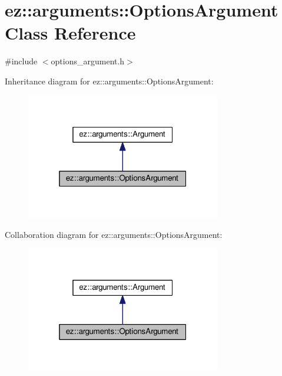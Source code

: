 \hypertarget{classez_1_1arguments_1_1OptionsArgument}{}\section{ez\+:\+:arguments\+:\+:Options\+Argument Class Reference}
\label{classez_1_1arguments_1_1OptionsArgument}


{\ttfamily \#include $<$options\+\_\+argument.\+h$>$}



Inheritance diagram for ez\+:\+:arguments\+:\+:Options\+Argument\+:
\nopagebreak
\begin{figure}[H]
\begin{center}
\leavevmode
\includegraphics[width=241pt]{classez_1_1arguments_1_1OptionsArgument__inherit__graph}
\end{center}
\end{figure}


Collaboration diagram for ez\+:\+:arguments\+:\+:Options\+Argument\+:
\nopagebreak
\begin{figure}[H]
\begin{center}
\leavevmode
\includegraphics[width=241pt]{classez_1_1arguments_1_1OptionsArgument__coll__graph}
\end{center}
\end{figure}
